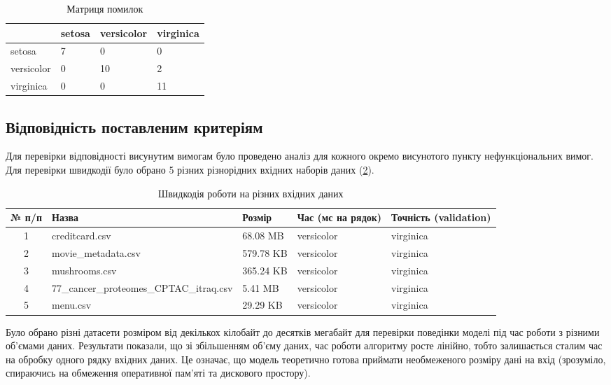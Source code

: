 \begin{table}[h!]
	\begin{tabularx}{\textwidth}{|X|X|X|X|}
    \hline
     & setosa & versicolor & virginica \\ \hline
    setosa & 7 & 0 & 0 \\ \hline
    versicolor & 0 & 10 & 2 \\ \hline
    virginica & 0 & 0 & 11 \\
    \hline
    \end{tabularx}
\caption{Матриця помилок} \label{tab:confusion_matrix}
\end{table}

\subsection{Відповідність поставленим критеріям}
Для перевірки відповідності висунутим вимогам було проведено аналіз для кожного окремо висунотого пункту нефункціональних вимог. Для перевірки швидкодії було обрано 5 різних різнорідних вхідних наборів даних (\ref{tab:datasets_performance}).

\begin{table}[h!]
	\begin{tabularx}{\textwidth}{|c|X|X|X|X|}
    \hline
    № п/п & Назва & Розмір & Час (мс на рядок) & Точність (validation) \\ \hline
    1 & creditcard.csv & 68.08 MB & versicolor & virginica \\ \hline
    2 & movie\_metadata.csv & 579.78 KB & versicolor & virginica \\ \hline
    3 & mushrooms.csv & 365.24 KB  & versicolor & virginica \\ \hline
    4 & 77\_cancer\_proteomes\_CPTAC\_itraq.csv & 5.41 MB & versicolor & virginica \\ \hline
    5 & menu.csv & 29.29 KB & versicolor & virginica \\
    \hline
    \end{tabularx}
\caption{Швидкодія роботи на різних вхідних даних} \label{tab:datasets_performance}
\end{table}

Було обрано різні датасети розміром від декількох кілобайт до десятків мегабайт для перевірки поведінки моделі під час роботи з різними об'ємами даних. Результати показали, що зі збільшенням об'єму даних, час роботи алгоритму росте лінійно, тобто залишається сталим час на обробку одного рядку вхідних даних. Це означає, що модель теоретично готова приймати необмеженого розміру дані на вхід (зрозуміло, спираючись на обмеження оперативної пам'яті та дискового простору).

